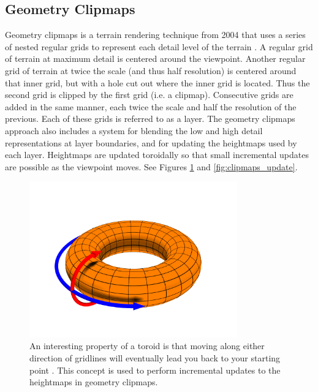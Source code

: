 \subsection{Geometry Clipmaps}

Geometry clipmaps is a terrain rendering technique from 2004 that uses a series of nested regular grids to represent each detail level of the terrain \cite{geometry_clipmaps}.
A regular grid of terrain at maximum detail is centered around the viewpoint.
Another regular grid of terrain at twice the scale (and thus half resolution) is centered around that inner grid, but with a hole cut out where the inner grid is located.
Thus the second grid is clipped by the first grid (i.e. a clipmap).
Consecutive grids are added in the same manner, each twice the scale and half the resolution of the previous.
Each of these grids is referred to as a layer.
The geometry clipmaps approach also includes a system for blending the low and high detail representations at layer boundaries, and for updating the heightmaps used by each layer.
Heightmaps are updated toroidally so that small incremental updates are possible as the viewpoint moves.
See Figures \ref{fig:toroid} and \ref{fig:clipmaps_update}.

\begin{figure}
	\centering
		\includegraphics[width=0.8\textwidth]{figures/torus.png}
	\caption{
		An interesting property of a toroid is that moving along either direction of gridlines will eventually lead you back to your starting point \cite{torus_fig}.
		This concept is used to perform incremental updates to the heightmaps in geometry clipmaps.
	}
	\label{fig:toroid}
\end{figure}

